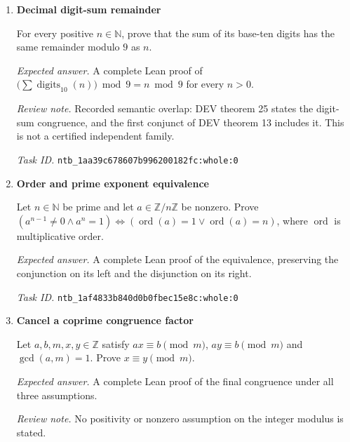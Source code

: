 \documentclass[11pt]{article}
\newcommand{\pth}[1]{\nolinkurl{#1}}
\begin{document}
\begin{enumerate}[label={TEST \arabic*.},leftmargin=4.5em,itemsep=1em]
Prove that it is false that every natural prime $p$ satisfies $\sum_{i=1}^{p}F_i\equiv J(p,5)\pmod p$. Here $F_i$ is the natural Fibonacci number, cast to an integer in the sum, and $J$ is the Jacobi symbol.

\emph{Expected answer.} A complete Lean proof negating the universal prime congruence, rather than proving that congruence for all primes.

\emph{Task ID.} \pth{ntb_1a7891d49276f2fdb7643bdf:whole:0}

\item \textbf{Decimal digit-sum remainder}\label{qn:test:9}

For every positive $n\in\mathbb{N}$, prove that the sum of its base-ten digits has the same remainder modulo $9$ as $n$.

\emph{Expected answer.} A complete Lean proof of $\bigl(\sum\operatorname{digits}_{10}(n)\bigr)\bmod9=n\bmod9$ for every $n>0$.

\emph{Review note.} Recorded semantic overlap: DEV theorem 25 states the digit-sum congruence, and the first conjunct of DEV theorem 13 includes it. This is not a certified independent family.

\emph{Task ID.} \pth{ntb_1aa39c678607b996200182fc:whole:0}

\item \textbf{Order and prime exponent equivalence}\label{qn:test:10}

Let $n\in\mathbb{N}$ be prime and let $a\in\mathbb{Z}/n\mathbb{Z}$ be nonzero. Prove $(a^{n-1}\ne0\land a^n=1)\Longleftrightarrow(\operatorname{ord}(a)=1\lor\operatorname{ord}(a)=n)$, where $\operatorname{ord}$ is multiplicative order.

\emph{Expected answer.} A complete Lean proof of the equivalence, preserving the conjunction on its left and the disjunction on its right.

\emph{Task ID.} \pth{ntb_1af4833b840d0b0fbec15e8c:whole:0}

\item \textbf{Cancel a coprime congruence factor}\label{qn:test:11}

Let $a,b,m,x,y\in\mathbb{Z}$ satisfy $ax\equiv b\pmod m$, $ay\equiv b\pmod m$ and $\gcd(a,m)=1$. Prove $x\equiv y\pmod m$.

\emph{Expected answer.} A complete Lean proof of the final congruence under all three assumptions.

\emph{Review note.} No positivity or nonzero assumption on the integer modulus is stated.


\end{enumerate}
\end{document}
